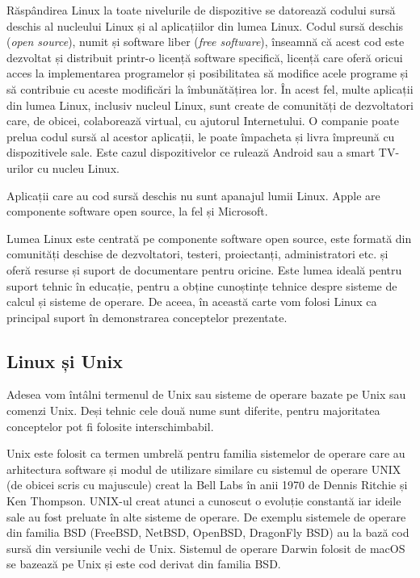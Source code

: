 Răspândirea Linux la toate nivelurile de dispozitive se datorează codului sursă deschis al nucleului Linux și al aplicațiilor din lumea Linux.
Codul sursă deschis (\textit{open source}), numit și software liber (\textit{free software}), înseamnă că acest cod este dezvoltat și distribuit printr-o licență software specifică, licență care oferă oricui acces la implementarea programelor și posibilitatea să modifice acele programe și să contribuie cu aceste modificări la îmbunătățirea lor.
În acest fel, multe aplicații din lumea Linux, inclusiv nucleul Linux, sunt create de comunități de dezvoltatori care, de obicei, colaborează virtual, cu ajutorul Internetului.
O companie poate prelua codul sursă al acestor aplicații, le poate împacheta și livra împreună cu dispozitivele sale.
Este cazul dispozitivelor ce rulează Android sau a smart TV-urilor cu nucleu Linux.

Aplicații care au cod sursă deschis nu sunt apanajul lumii Linux.
Apple are componente software open source, la fel și Microsoft.

Lumea Linux este centrată pe componente software open source, este formată din comunități deschise de dezvoltatori, testeri, proiectanți, administratori etc.
și oferă resurse și suport de documentare pentru oricine.
Este lumea ideală pentru suport tehnic în educație, pentru a obține cunoștințe tehnice despre sisteme de calcul și sisteme de operare.
De aceea, în această carte vom folosi Linux ca principal suport în demonstrarea conceptelor prezentate.

\subsection{Linux și Unix}
\label{sec:intro:linux-unix}

Adesea vom întâlni termenul de Unix sau sisteme de operare bazate pe Unix sau comenzi Unix.
Deși tehnic cele două nume sunt diferite, pentru majoritatea conceptelor pot fi folosite interschimbabil.

Unix este folosit ca termen umbrelă pentru familia sistemelor de operare care au arhitectura software și modul de utilizare similare cu sistemul de operare UNIX (de obicei scris cu majuscule) creat la Bell Labs în anii 1970 de Dennis Ritchie și Ken Thompson.
UNIX-ul creat atunci a cunoscut o evoluție constantă iar ideile sale au fost preluate în alte sisteme de operare.
De exemplu sistemele de operare din familia BSD (FreeBSD, NetBSD, OpenBSD, DragonFly BSD) au la bază cod sursă din versiunile vechi de Unix.
Sistemul de operare Darwin folosit de macOS se bazează pe Unix și este cod derivat din familia BSD.

